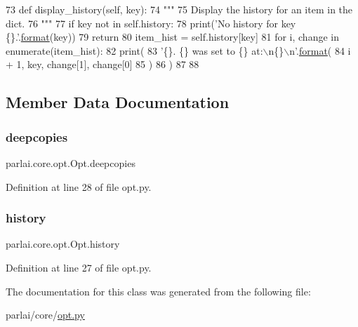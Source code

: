 \begin{DoxyCode}
73     \textcolor{keyword}{def }display\_history(self, key):
74         \textcolor{stringliteral}{"""}
75 \textcolor{stringliteral}{        Display the history for an item in the dict.}
76 \textcolor{stringliteral}{        """}
77         \textcolor{keywordflow}{if} key \textcolor{keywordflow}{not} \textcolor{keywordflow}{in} self.history:
78             print(\textcolor{stringliteral}{'No history for key \{\}.'}.\hyperlink{namespaceparlai_1_1chat__service_1_1services_1_1messenger_1_1shared__utils_a32e2e2022b824fbaf80c747160b52a76}{format}(key))
79             \textcolor{keywordflow}{return}
80         item\_hist = self.history[key]
81         \textcolor{keywordflow}{for} i, change \textcolor{keywordflow}{in} enumerate(item\_hist):
82             print(
83                 \textcolor{stringliteral}{'\{\}. \{\} was set to \{\} at:\(\backslash\)n\{\}\(\backslash\)n'}.\hyperlink{namespaceparlai_1_1chat__service_1_1services_1_1messenger_1_1shared__utils_a32e2e2022b824fbaf80c747160b52a76}{format}(
84                     i + 1, key, change[1], change[0]
85                 )
86             )
87 
88 
\end{DoxyCode}


\subsection{Member Data Documentation}
\mbox{\label{classparlai_1_1core_1_1opt_1_1Opt_aa0cb3badf064394ac171e3703628660e}} 
\subsubsection{\texorpdfstring{deepcopies}{deepcopies}}
{\footnotesize\ttfamily parlai.\+core.\+opt.\+Opt.\+deepcopies}



Definition at line 28 of file opt.\+py.

\mbox{\label{classparlai_1_1core_1_1opt_1_1Opt_ab2dc506896dbaa06f1ab4da49847121a}} 
\subsubsection{\texorpdfstring{history}{history}}
{\footnotesize\ttfamily parlai.\+core.\+opt.\+Opt.\+history}



Definition at line 27 of file opt.\+py.



The documentation for this class was generated from the following file\+:\begin{DoxyCompactItemize}
\item 
parlai/core/\hyperlink{opt_8py}{opt.\+py}\end{DoxyCompactItemize}
